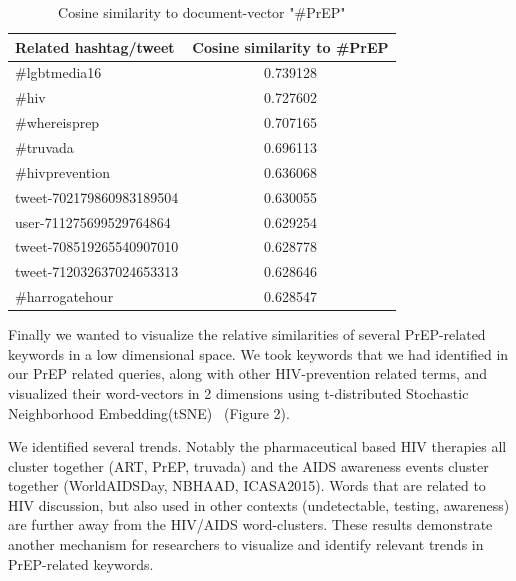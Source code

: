 \documentclass{sig-alternate-05-2015}
\begin{document}
\begin{table}
\centering
\caption{Cosine similarity to document-vector "\#PrEP"}
\begin{tabular}{|l|c|} \hline
Related hashtag/tweet & Cosine similarity to \#PrEP\\ \hline
\#lgbtmedia16 & 0.739128\\ \hline
\#hiv & 	0.727602 \\ \hline
\#whereisprep & 0.707165 \\ \hline
\#truvada & 0.696113 \\ \hline
\#hivprevention & 0.636068 \\ \hline
tweet-702179860983189504 & 0.630055\\ \hline
user-711275699529764864 & 0.629254\\ \hline
tweet-708519265540907010 & 0.628778 \\ \hline
tweet-712032637024653313 & 0.628646 \\ \hline
\#harrogatehour & 0.628547 \\ \hline
\hline\end{tabular}
\end{table}

Finally we wanted to visualize the relative similarities of several PrEP-related keywords in a low dimensional space. We took keywords that we had identified in our PrEP related queries, along with other HIV-prevention related terms, and visualized their word-vectors in 2 dimensions using t-distributed Stochastic Neighborhood Embedding(tSNE)~\cite{van2008visualizing} (Figure 2).

We identified several trends. Notably the pharmaceutical based HIV therapies all cluster together (ART, PrEP, truvada) and the AIDS awareness events cluster together (WorldAIDSDay, NBHAAD, ICASA2015). Words that are related to HIV discussion, but also used in other contexts (undetectable, testing, awareness) are further away from the HIV/AIDS word-clusters. These results demonstrate another mechanism for researchers to visualize and identify relevant trends in PrEP-related keywords.
\end{document}
